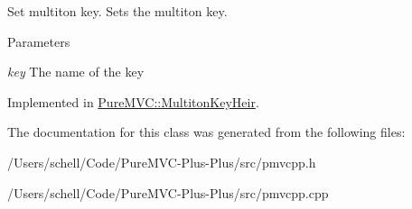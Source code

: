 Set multiton key. Sets the multiton key. 
\begin{DoxyParams}{Parameters}
\item[{\em key}]The name of the key \end{DoxyParams}


Implemented in \hyperlink{class_pure_m_v_c_1_1_multiton_key_heir_abc70ef7c066bc8d7bf0196ec727599bb}{PureMVC::MultitonKeyHeir}.

The documentation for this class was generated from the following files:\begin{DoxyCompactItemize}
\item 
/Users/schell/Code/PureMVC-\/Plus-\/Plus/src/pmvcpp.h\item 
/Users/schell/Code/PureMVC-\/Plus-\/Plus/src/pmvcpp.cpp\end{DoxyCompactItemize}
